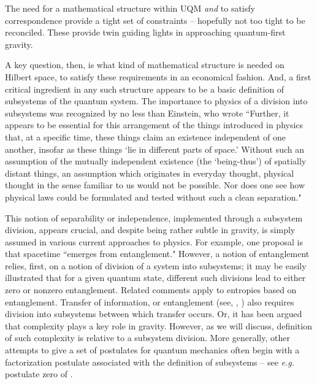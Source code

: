 The need for a mathematical structure within UQM {\it and} to satisfy correspondence provide a tight set of constraints -- hopefully not too tight to be reconciled.  These provide twin guiding lights in approaching quantum-first gravity.  

A key question, then, is what kind of mathematical structure is needed on Hilbert space, to satisfy these requirements in an economical fashion.  And, a first critical ingredient in any such structure appears to be a basic definition of subsystems of the quantum system.  The importance to physics of a division into subsystems was recognized by no less than Einstein, who wrote  ``Further, it appears to be essential for this arrangement of the things introduced in physics that, at a specific time, these things claim an existence independent of one another, insofar as these things `lie in different parts of space.'  Without such an assumption of the mutually independent existence (the `being-thus') of spatially distant things, an assumption which originates in everyday thought, physical thought in the sense familiar to us would not be possible.  Nor does one see how physical laws could be formulated and tested without such a clean separation."  

This notion of separability or independence, implemented through a subsystem division, appears crucial, and despite being rather subtle in gravity, is simply assumed in various current approaches to physics.  For example, one proposal is that spacetime ``emerges from entanglement."  However, a notion of entanglement relies, first, on a notion of division of a system into subsystems; it may be easily illustrated that for a given quantum state, different such divisions lead to either zero or nonzero entanglement.  Related comments apply to entropies based on entanglement. Transfer of information, or entanglement (see, \eg, ) also requires division into subsystems between which transfer occurs.  Or, it has been argued that complexity plays a key role in gravity.  However, as we will discuss, definition of such complexity is relative to a subsystem division.  More generally, other attempts to give a set of postulates for quantum mechanics often begin with a factorization postulate associated with the definition of subsystems -- see {\it e.g.} postulate zero of .

